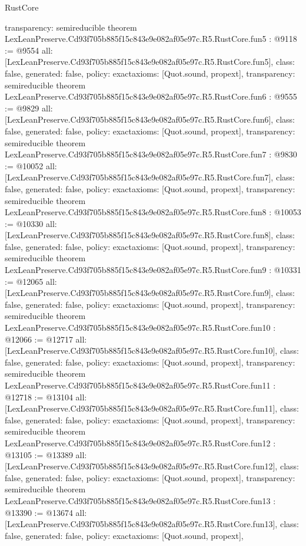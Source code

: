 \begin{lexlean}{RustCore}
\begin{coremodule}
{  transparency: semireducible
}
theorem LexLeanPreserve.Cd93f705b885f15c843e9e082af05e97c.R5.RustCore.fun5 : @9118 := @9554 {
  all: [LexLeanPreserve.Cd93f705b885f15c843e9e082af05e97c.R5.RustCore.fun5],
  class: false,
  generated: false,
  policy: exact{axioms: [Quot.sound, propext]},
  transparency: semireducible
}
theorem LexLeanPreserve.Cd93f705b885f15c843e9e082af05e97c.R5.RustCore.fun6 : @9555 := @9829 {
  all: [LexLeanPreserve.Cd93f705b885f15c843e9e082af05e97c.R5.RustCore.fun6],
  class: false,
  generated: false,
  policy: exact{axioms: [Quot.sound, propext]},
  transparency: semireducible
}
theorem LexLeanPreserve.Cd93f705b885f15c843e9e082af05e97c.R5.RustCore.fun7 : @9830 := @10052 {
  all: [LexLeanPreserve.Cd93f705b885f15c843e9e082af05e97c.R5.RustCore.fun7],
  class: false,
  generated: false,
  policy: exact{axioms: [Quot.sound, propext]},
  transparency: semireducible
}
theorem LexLeanPreserve.Cd93f705b885f15c843e9e082af05e97c.R5.RustCore.fun8 : @10053 := @10330 {
  all: [LexLeanPreserve.Cd93f705b885f15c843e9e082af05e97c.R5.RustCore.fun8],
  class: false,
  generated: false,
  policy: exact{axioms: [Quot.sound, propext]},
  transparency: semireducible
}
theorem LexLeanPreserve.Cd93f705b885f15c843e9e082af05e97c.R5.RustCore.fun9 : @10331 := @12065 {
  all: [LexLeanPreserve.Cd93f705b885f15c843e9e082af05e97c.R5.RustCore.fun9],
  class: false,
  generated: false,
  policy: exact{axioms: [Quot.sound, propext]},
  transparency: semireducible
}
theorem LexLeanPreserve.Cd93f705b885f15c843e9e082af05e97c.R5.RustCore.fun10 : @12066 := @12717 {
  all: [LexLeanPreserve.Cd93f705b885f15c843e9e082af05e97c.R5.RustCore.fun10],
  class: false,
  generated: false,
  policy: exact{axioms: [Quot.sound, propext]},
  transparency: semireducible
}
theorem LexLeanPreserve.Cd93f705b885f15c843e9e082af05e97c.R5.RustCore.fun11 : @12718 := @13104 {
  all: [LexLeanPreserve.Cd93f705b885f15c843e9e082af05e97c.R5.RustCore.fun11],
  class: false,
  generated: false,
  policy: exact{axioms: [Quot.sound, propext]},
  transparency: semireducible
}
theorem LexLeanPreserve.Cd93f705b885f15c843e9e082af05e97c.R5.RustCore.fun12 : @13105 := @13389 {
  all: [LexLeanPreserve.Cd93f705b885f15c843e9e082af05e97c.R5.RustCore.fun12],
  class: false,
  generated: false,
  policy: exact{axioms: [Quot.sound, propext]},
  transparency: semireducible
}
theorem LexLeanPreserve.Cd93f705b885f15c843e9e082af05e97c.R5.RustCore.fun13 : @13390 := @13674 {
  all: [LexLeanPreserve.Cd93f705b885f15c843e9e082af05e97c.R5.RustCore.fun13],
  class: false,
  generated: false,
  policy: exact{axioms: [Quot.sound, propext]},
}
\end{coremodule}
\end{lexlean}
